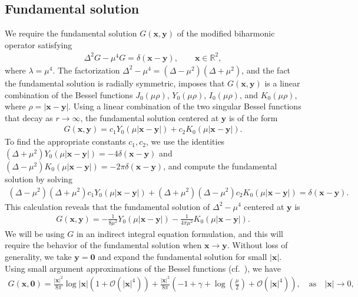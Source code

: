 \documentclass[times]{article}
\newcommand{\xx}{\mathbf{x}}
\newcommand{\yy}{\mathbf{y}}
\begin{document}
\subsection{Fundamental solution}
\label{sec:fundSoln}
We require the fundamental solution $G(\xx,\yy)$ of the modified biharmonic operator satisfying
\begin{align*}
  \Delta^2 G - \mu^4 G = \delta(\xx-\yy), \qquad \xx \in \mathbb{R}^2,
\end{align*}
where $\lambda = \mu^4$.  The factorization $\Delta^2 - \mu^4 =
(\Delta - \mu^2)(\Delta + \mu^2)$, and the fact the fundamental
solution is radially symmetric, imposes that $G(\xx,\yy)$ is a linear
combination of the Bessel functions $J_0(\mu \rho)$, $Y_0(\mu \rho)$,
$I_0(\mu \rho)$, and $K_0(\mu \rho)$, where $\rho = |\xx-\yy|$.  Using
a linear combination of the two singular Bessel functions that decay as
$r \rightarrow \infty$, the fundamental solution centered at $\yy$ is
of the form
\begin{align*}
  G(\xx,\yy) = c_{1}Y_{0}(\mu|\xx-\yy|) + c_{2}K_{0}(\mu|\xx-\yy|).
\end{align*} 
To find the appropriate constants $c_1, c_2$, we use the identities
$(\Delta + \mu^{2})Y_{0}(\mu|\xx-\yy|) = -4\delta(\xx-\yy)$ and $(\Delta
- \mu^{2})K_{0}(\mu|\xx - \yy|)  = -2\pi\delta(\xx-\yy)$, and compute
the fundamental solution by solving
\begin{align*}
  (\Delta - \mu^{2})(\Delta + \mu^{2})c_{1}Y_{0}(\mu|\xx-\yy|) + 
  (\Delta + \mu^{2})(\Delta - \mu^{2})c_{2}K_{0}(\mu|\xx-\yy|)=
  \delta(\xx-\yy).
\end{align*}
This calculation reveals that the fundamental solution of $\Delta^{2} -
\mu^{4}$ centered at $\yy$ is 
\begin{align}
  \label{FundamentalGreens}
  G(\xx,\yy) = -\frac{1}{8\mu^{2}} Y_{0}(\mu|\xx-\yy|) - 
            \frac{1}{4\pi\mu^{2}} K_{0}(\mu|\xx-\yy|).
\end{align}
We will be using $G$ in an indirect integral equation formulation, and
this will require the behavior of the fundamental solution when $\xx
\rightarrow \yy$.  Without loss of generality, we take $\yy=\textbf{0}$
and expand the fundamental solution for small $|\xx|$.  Using small
argument approximations of the Bessel functions
(cf.~\cite{abr-ste1964}), we have
\begin{align*}
  G(\xx,\textbf{0}) =  
      \frac{|\xx|^2}{8\pi}\log |\xx| \left(1 +
      \mathcal{O}(|\xx|^{4})\right)
      +\frac{|\xx|^{2}}{8\pi}\left(-1 + \gamma +
      \log\left(\frac{\mu}{2}\right) + \mathcal{O}(|\xx|^{4})\right),
      \quad \mbox{as} \quad |\xx|\to0,
\end{align*}
\end{document}
